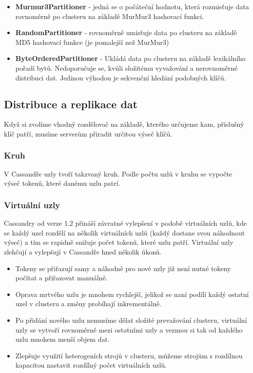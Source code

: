 \begin{itemize}
\item \textbf{Murmur3Partitioner} - jedná se o počáteční hodnotu, která rozmisťuje data rovnoměrně po clusteru na základě MurMur3 hashovací funkci.
\item \textbf{RandomPartitioner} - rovnoměrně umisťuje data po clusteru na základě MD5 hashovací funkce (je pomalejší než MurMur3)
\item \textbf{ByteOrderedPartitioner} -  Ukládá data po clusteru na základě lexikálního pořadí bytů. Nedoporučuje se, kvůli složitému vyvažování a nerovnoměrné distribuci dat. Jedinou výhodou je sekvenční hledání podobných klíčů.
\end{itemize}

\subsection{Distribuce a replikace dat}
Když si zvolíme vhodný rozdělovač na základě, kterého určujeme kam, příslušný klíč patří, musíme serverům přiradit určitou výseč klíčů. 

\subsubsection{Kruh}
V Cassandře uzly tvoří takzvaný kruh. Podle počtu uzlů v kruhu se vypočte výseč tokenů, které danému uzlu patrí. 

\subsubsection{Virtuální uzly}
Cassandry od verze 1.2 přináší závratné vylepšení v podobě virtuálních uzlů, kde se každý uzel rozdělí na několik virtuálních uzlů (každý dostane svou náhodnout výseč) a tím se rapidně snižuje počet tokenů, které uzlu patří. Virtuální uzly zlehčují a vylepšují v Cassandře hned několik úkonů.

\begin{itemize}
\item Tokeny se přiřazují samy a náhodně pro nové uzly již není nutné tokeny počítat a přiřazovat manuálně.
\item Oprava mrtvého uzlu je mnohem rychlejší, jelikož se naní podílí každý ostatní uzel v clusteru a změny probíhají inkrementálně.
\item Po přidání nového uzlu nemusíme dělat složité prevažování clusteru, virtuální uzly se vytvoří rovnoměrně mezi ostatními uzly a vezmou si tak od každého uzlu mnohem menší objem dat.
\item Zlepšuje využití heterogeních strojů v clusteru, můžeme strojům s rozdílnou kapacitou nastavit rozdílný počet virtuálních uzlů.
\end{itemize}

